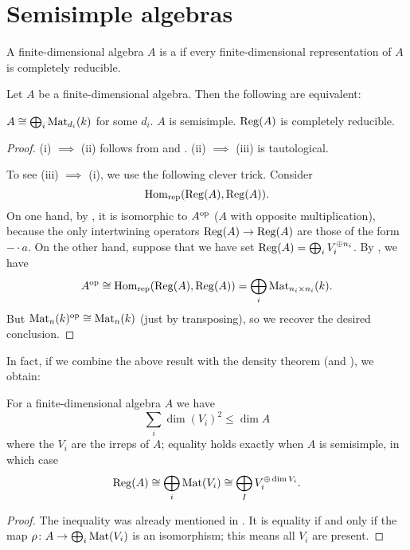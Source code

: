 \section{Semisimple algebras}

\begin{definition}
	A finite-dimensional algebra $A$ is a 
	if every finite-dimensional representation of $A$ is completely reducible.
\end{definition}

\begin{theorem}
	Let $A$ be a finite-dimensional algebra.
	Then the following are equivalent:
	\begin{enumerate}[(i)]
		\ii $A \cong \bigoplus_i \mathrm{Mat}_{d_i}(k)$ for some $d_i$.
		\ii $A$ is semisimple.
		\ii $\operatorname{Reg}(A)$ is completely reducible.
	\end{enumerate}
\end{theorem}
\begin{proof}
	(i) $\implies$ (ii) follows
	from  and .
	(ii) $\implies$ (iii) is tautological.

	To see (iii) $\implies$ (i), we use the following clever trick.
	Consider
	\[ \operatorname{Hom}_{\mathrm{rep}}(\operatorname{Reg}(A), \operatorname{Reg}(A)). \]
	On one hand, by ,
	it is isomorphic to $A^{\mathrm{op}}$ ($A$ with opposite multiplication),
	because the only intertwining operators $\operatorname{Reg}(A) \to \operatorname{Reg}(A)$
	are those of the form $- \cdot a$.
	On the other hand, suppose that we have set
	$ \operatorname{Reg}(A) = \bigoplus_i V_i^{\oplus n_i} $.
	By , we have
	\[ A^{\mathrm{op}} \cong \operatorname{Hom}_{\mathrm{rep}}(\operatorname{Reg}(A), \operatorname{Reg}(A))
		= \bigoplus_i \mathrm{Mat}_{n_i \times n_i}(k). \]
	But $\mathrm{Mat}_n(k)^{\mathrm{op}} \cong \mathrm{Mat}_n(k)$ (just by transposing),
	so we recover the desired conclusion.
\end{proof}

In fact, if we combine the above result with
the density theorem (and ), we obtain:
\begin{theorem}
	For a finite-dimensional algebra $A$ we have
	\[ \sum_{i} \dim(V_i)^2 \le \dim A \]
	where the $V_i$ are the irreps of $A$;
	equality holds exactly when $A$ is semisimple,
	in which case
	\[ \operatorname{Reg}(A) \cong \bigoplus_i \mathrm{Mat}(V_i)
		\cong \bigoplus_I V_i^{\oplus \dim V_i}. \]
\end{theorem}
\begin{proof}
	The inequality was already mentioned in .
	It is equality if and only if the map $\rho \colon A \to \bigoplus_i \mathrm{Mat}(V_i)$
	is an isomorphism; this means all $V_i$ are present.
\end{proof}

